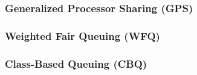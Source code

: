 \subsubsection{Generalized Processor Sharing (GPS)}\label{subsubsec:Generalized_Processor_Sharing}
\subsubsection{Weighted Fair Queuing (WFQ)}\label{subsubsec:Weighted_Fair_Queuing}
\subsubsection{Class-Based Queuing (CBQ)}\label{subsubsec:Class_Based_Queuing}
